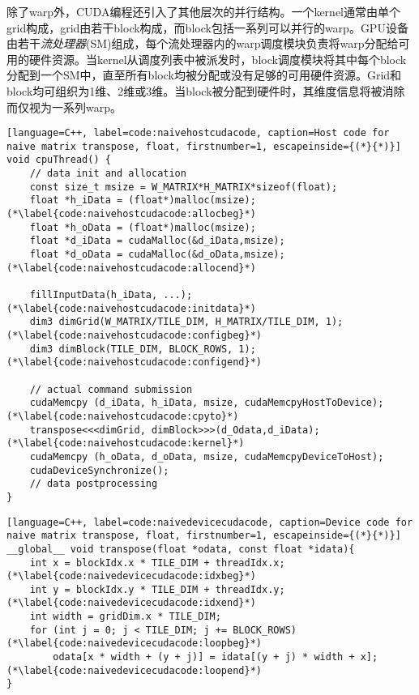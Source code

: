 除了warp外，CUDA编程还引入了其他层次的并行结构。一个kernel通常由单个grid构成，grid由若干block构成，而block包括一系列可以并行的warp。GPU设备由若干\emph{流处理器}(SM)组成，每个流处理器内的warp调度模块负责将warp分配给可用的硬件资源。当kernel从调度列表中被派发时，block调度模块将其中每个block分配到一个SM中，直至所有block均被分配或没有足够的可用硬件资源。Grid和block均可组织为1维、2维或3维。当block被分配到硬件时，其维度信息将被消除而仅视为一系列warp。

\begin{lstlisting}[language=C++, label=code:naivehostcudacode, caption=Host code for naive matrix transpose, float, firstnumber=1, escapeinside={(*}{*)}]
void cpuThread() {
    // data init and allocation
    const size_t msize = W_MATRIX*H_MATRIX*sizeof(float);
    float *h_iData = (float*)malloc(msize); (*\label{code:naivehostcudacode:allocbeg}*)
    float *h_oData = (float*)malloc(msize);
    float *d_iData = cudaMalloc(&d_iData,msize);
    float *d_oData = cudaMalloc(&d_oData,msize); (*\label{code:naivehostcudacode:allocend}*)

    fillInputData(h_iData, ...); (*\label{code:naivehostcudacode:initdata}*)
    dim3 dimGrid(W_MATRIX/TILE_DIM, H_MATRIX/TILE_DIM, 1); (*\label{code:naivehostcudacode:configbeg}*)
    dim3 dimBlock(TILE_DIM, BLOCK_ROWS, 1); (*\label{code:naivehostcudacode:configend}*)

    // actual command submission
    cudaMemcpy (d_iData, h_iData, msize, cudaMemcpyHostToDevice); (*\label{code:naivehostcudacode:cpyto}*)
    transpose<<<dimGrid, dimBlock>>>(d_Odata,d_iData); (*\label{code:naivehostcudacode:kernel}*)
    cudaMemcpy (h_oData, d_oData, msize, cudaMemcpyDeviceToHost);
    cudaDeviceSynchronize();
    // data postprocessing
}
\end{lstlisting}

\begin{lstlisting}[language=C++, label=code:naivedevicecudacode, caption=Device code for naive matrix transpose, float, firstnumber=1, escapeinside={(*}{*)}]
__global__ void transpose(float *odata, const float *idata){
    int x = blockIdx.x * TILE_DIM + threadIdx.x; (*\label{code:naivedevicecudacode:idxbeg}*)
    int y = blockIdx.y * TILE_DIM + threadIdx.y; (*\label{code:naivedevicecudacode:idxend}*)
    int width = gridDim.x * TILE_DIM;
    for (int j = 0; j < TILE_DIM; j += BLOCK_ROWS) (*\label{code:naivedevicecudacode:loopbeg}*)
        odata[x * width + (y + j)] = idata[(y + j) * width + x]; (*\label{code:naivedevicecudacode:loopend}*)
}
\end{lstlisting}

